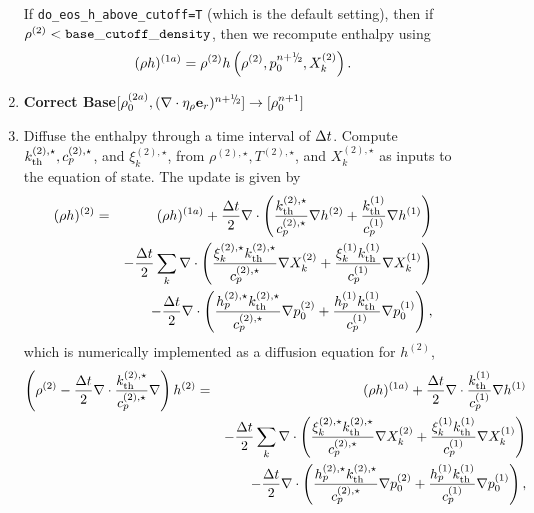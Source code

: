\begin{description}
\begin{enumerate}
\begin{enumerate}
\begin{description}
\end{description}

\end{enumerate}

If {\tt do\_eos\_h\_above\_cutoff=T} (which is the default setting), then if
$\rho^{(2)} < {\tt base\_cutoff\_density}$, then we recompute enthalpy using
\begin{equation}
(\rho h)^{(1a)} = \rho^{(2)}h\left(\rho^{(2)},p_0^{n+\myhalf},X_k^{(2)}\right).
\end{equation}

\item {\bf Correct Base}$[\rho_0^{(2a)}, (\nabla\cdot\etarho\er)^{\nph}] \rightarrow [\rho_0^{n+1}]$

\item Diffuse the enthalpy through a time interval of $\Delta t$.  Compute $k_{\rm th}^{(2),\star}, c_p^{(2),\star}$, and $\xi_k^{(2),\star}$, from $\rho^{(2),\star}, T^{(2),\star}$, and $X_k^{(2),\star}$ as inputs to the equation of state.  The update is given by
\begin{eqnarray}
(\rho h)^{(2)} &=& (\rho h)^{(1a)} + \frac{\Delta t}{2}\nabla\cdot\left(\frac{k_{\rm th}^{(2),\star}}{c_p^{(2),\star}}\nabla h^{(2)} + \frac{k_{\rm th}^{(1)}}{c_p^{(1)}}\nabla h^{(1)}\right)\nonumber\\
&&- \frac{\Delta t}{2}\sum_k\nabla\cdot\left(\frac{\xi_k^{(2),\star}k_{\rm th}^{(2),\star}}{c_p^{(2),\star}}\nabla X_k^{(2)} + \frac{\xi_k^{(1)}k_{\rm th}^{(1)}}{c_p^{(1)}}\nabla X_k^{(1)}\right)\nonumber\\
&&- \frac{\Delta t}{2}\nabla\cdot\left(\frac{h_p^{(2),\star}k_{\rm th}^{(2),\star}}{c_p^{(2),\star}}\nabla p_0^{(2)} + \frac{h_p^{(1)}k_{\rm th}^{(1)}}{c_p^{(1)}}\nabla p_0^{(1)}\right),
\end{eqnarray}
which is numerically implemented as a diffusion equation for $h^{(2)}$,
\begin{eqnarray}
\left(\rho^{(2)} - \frac{\dt}{2}\nabla\cdot\frac{\kth^{(2),\star}}{c_p^{(2),\star}}\nabla\right)h^{(2)} &=& (\rho h)^{(1a)} + \frac{\dt}{2}\nabla\cdot\frac{\kth^{(1)}}{c_p^{(1)}}\nabla h^{(1)}\nonumber\\
&&- \frac{\dt}{2}\sum_k\nabla\cdot\left(\frac{\xi_k^{(2),\star}\kth^{(2),\star}}{c_p^{(2),\star}}\nabla X_k^{(2)} + \frac{\xi_k^{(1)}\kth^{(1)}}{c_p^{(1)}}\nabla X_k^{(1)}\right)\nonumber\\
&&- \frac{\dt}{2}\nabla\cdot\left(\frac{h_p^{(2),\star}\kth^{(2),\star}}{c_p^{(2),\star}}\nabla p_0^{(2)} + \frac{h_p^{(1)}\kth^{(1)}}{c_p^{(1)}}\nabla p_0^{(1)}\right),

\end{eqnarray}
\end{enumerate}
\end{description}
